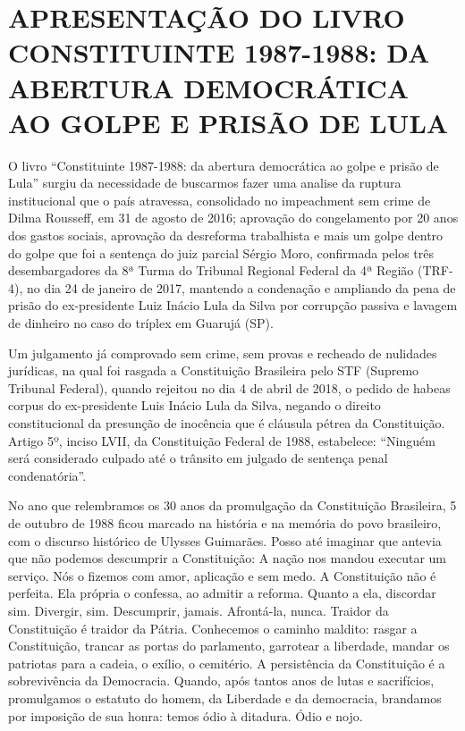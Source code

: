 \chapter{APRESENTAÇÃO DO LIVRO CONSTITUINTE 1987-1988: DA ABERTURA DEMOCRÁTICA AO GOLPE E PRISÃO DE LULA}

O livro “Constituinte 1987-1988: da abertura democrática ao golpe e prisão de Lula” surgiu da necessidade de buscarmos fazer uma analise da ruptura institucional que o país atravessa, consolidado no impeachment sem crime de Dilma Rousseff, em 31 de agosto de 2016; aprovação do congelamento por 20 anos dos gastos sociais, aprovação da desreforma trabalhista e mais um golpe dentro do golpe que foi a sentença do juiz parcial Sérgio Moro, confirmada pelos três desembargadores da 8ª Turma do Tribunal Regional Federal da 4ª Região (TRF-4), no dia 24 de janeiro de 2017, mantendo a condenação e ampliando da pena de prisão do ex-presidente Luiz Inácio Lula da Silva por corrupção passiva e lavagem de dinheiro no caso do tríplex em Guarujá (SP).

Um julgamento já comprovado sem crime, sem provas e recheado de nulidades jurídicas, na qual foi rasgada a Constituição Brasileira pelo STF (Supremo Tribunal Federal), quando rejeitou no dia 4 de abril de 2018, o pedido de habeas corpus do ex-presidente Luis Inácio Lula da Silva, negando o direito constitucional da presunção de inocência que é cláusula pétrea da Constituição. Artigo 5º, inciso LVII, da Constituição Federal de 1988, estabelece: “Ninguém será considerado culpado até o trânsito em julgado de sentença penal condenatória”.

No ano que relembramos os 30 anos da promulgação da Constituição Brasileira, 5 de outubro de 1988 ficou marcado na história e na memória do povo brasileiro, com o discurso histórico de Ulysses Guimarães. Posso até imaginar que antevia que não podemos descumprir a Constituição: A nação nos mandou executar um serviço. Nós o fizemos com amor, aplicação e sem medo. A Constituição não é perfeita. Ela própria o confessa, ao admitir a reforma. Quanto a ela, discordar sim. Divergir, sim. Descumprir, jamais. Afrontá-la, nunca. Traidor da Constituição é traidor da Pátria. Conhecemos o caminho maldito: rasgar a Constituição, trancar as portas do parlamento, garrotear a liberdade, mandar os patriotas para a cadeia, o exílio, o cemitério. A persistência da Constituição é a sobrevivência da Democracia. Quando, após tantos anos de lutas e sacrifícios, promulgamos o estatuto do homem, da Liberdade e da democracia, brandamos por imposição de sua honra: temos ódio à ditadura. Ódio e nojo.

